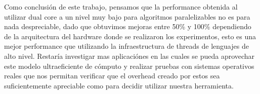 Como conclusión de este trabajo, pensamos que la performance obtenida al utilizar dual core a un nivel muy bajo para algoritmos paralelizables no es para nada despreciable, dado que obtuvimos mejoras entre 50\% y 100\% dependiendo de la arquitectura del hardware donde se realizaron los experimentos, esto es una mejor performance que utilizando la infraestructura de threads de lenguajes de alto nivel. Restaría investigar mas aplicaciónes en las cuales se pueda aprovechar este modelo ultraeficiente de cómputo y realizar pruebas con sistemas operativos reales que nos permitan verificar que el overhead creado por estos sea suficientemente apreciable como para decidir utilizar nuestra herramienta.